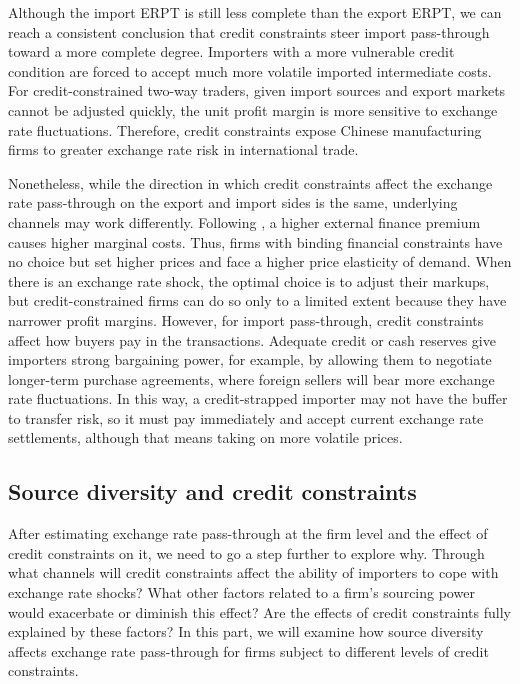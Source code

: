 \documentclass[12pt]{article}
\begin{document}
Although the import ERPT is still less complete than the export ERPT, we can reach a consistent conclusion that credit constraints steer import pass-through toward a more complete degree.  Importers with a more vulnerable credit condition are forced to accept much more volatile imported intermediate costs. For credit-constrained two-way traders, given import sources and export markets cannot be adjusted quickly, the unit profit margin is more sensitive to exchange rate fluctuations. Therefore, credit constraints expose Chinese manufacturing firms to greater exchange rate risk in international trade.

Nonetheless, while the direction in which credit constraints affect the exchange rate pass-through on the export and import sides is the same, underlying channels may work differently. Following \cite{strasser2013}, a higher external finance premium causes higher marginal costs. Thus, firms with binding financial constraints have no choice but set higher prices and face a higher price elasticity of demand. When there is an exchange rate shock, the optimal choice is to adjust their markups, but credit-constrained firms can do so only to a limited extent because they have narrower profit margins. However, for import pass-through, credit constraints affect how buyers pay in the transactions. Adequate credit or cash reserves give importers strong bargaining power, for example, by allowing them to negotiate longer-term purchase agreements, where foreign sellers will bear more exchange rate fluctuations. In this way, a credit-strapped importer may not have the buffer to transfer risk, so it must pay immediately and accept current exchange rate settlements, although that means taking on more volatile prices.

\subsection{Source diversity and credit constraints}

After estimating exchange rate pass-through at the firm level and the effect of credit constraints on it, we need to go a step further to explore why. Through what channels will credit constraints affect the ability of importers to cope with exchange rate shocks? What other factors related to a firm's sourcing power would exacerbate or diminish this effect? Are the effects of credit constraints fully explained by these factors? In this part, we will examine how source diversity affects exchange rate pass-through for firms subject to different levels of credit constraints.
\end{document}
